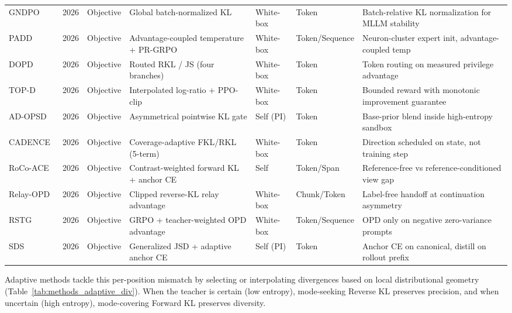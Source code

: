 \documentclass{article} %
\begin{document}
\begin{table}[t]
{\begin{tabular}{@{}lclllll@{}}
        GNDPO~\citep{2606.09091} & 2026 & Objective & Global batch-normalized KL & White-box & Token & Batch-relative KL normalization for MLLM stability \\
        PADD~\citep{2606.10369} & 2026 & Objective & Advantage-coupled temperature + PR-GRPO & White-box & Token/Sequence & Neuron-cluster expert init, advantage-coupled temp \\
        DOPD~\citep{2606.30626} & 2026 & Objective & Routed RKL / JS (four branches) & White-box & Token & Token routing on measured privilege advantage \\
        TOP-D~\citep{2607.04751} & 2026 & Objective & Interpolated log-ratio + PPO-clip & White-box & Token & Bounded reward with monotonic improvement guarantee \\
        AD-OPSD~\citep{2607.10805} & 2026 & Objective & Asymmetrical pointwise KL gate & Self (PI) & Token & Base-prior blend inside high-entropy sandbox \\
        CADENCE~\citep{2607.16955} & 2026 & Objective & Coverage-adaptive FKL/RKL (5-term) & White-box & Token & Direction scheduled on state, not training step \\
        RoCo-ACE~\citep{2607.24771} & 2026 & Objective & Contrast-weighted forward KL + anchor CE & Self & Token/Span & Reference-free vs reference-conditioned view gap \\
        Relay-OPD~\citep{2607.26057} & 2026 & Objective & Clipped reverse-KL relay advantage & White-box & Chunk/Token & Label-free handoff at continuation asymmetry \\
        RSTG~\citep{2608.00782} & 2026 & Objective & GRPO + teacher-weighted OPD advantage & White-box & Token/Sequence & OPD only on negative zero-variance prompts \\
        SDS~\citep{2608.07935} & 2026 & Objective & Generalized JSD + adaptive anchor CE & Self (PI) & Token & Anchor CE on canonical, distill on rollout prefix \\
        \bottomrule
    \end{tabular}
    }
\end{table}

Adaptive methods tackle this per-position mismatch by selecting or interpolating divergences based on local distributional geometry (Table~\ref{tab:methods_adaptive_div}). When the teacher is certain (low entropy), mode-seeking Reverse KL preserves precision, and when uncertain (high entropy), mode-covering Forward KL preserves diversity.
\end{document}

